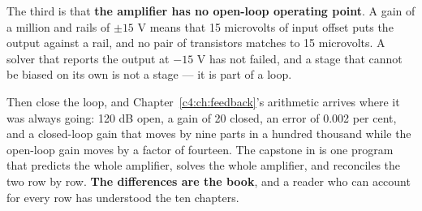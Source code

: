 The third is that \textbf{the amplifier has no open-loop operating point}. A gain of a million and
rails of $\pm 15$ V means that 15 microvolts of input offset puts the output against a rail, and no
pair of transistors matches to 15 microvolts. A solver that reports the output at $-15$ V has not
failed, and a stage that cannot be biased on its own is not a stage --- it is part of a loop.

Then close the loop, and Chapter~\ref{c4:ch:feedback}'s arithmetic arrives where it was always
going: 120 dB open, a gain of 20 closed, an error of 0.002 per cent, and a closed-loop gain that
moves by nine parts in a hundred thousand while the open-loop gain moves by a factor of fourteen.
The capstone in  is one program that predicts the whole amplifier, solves
the whole amplifier, and reconciles the two row by row. \textbf{The differences are the book}, and
a reader who can account for every row has understood the ten chapters.





